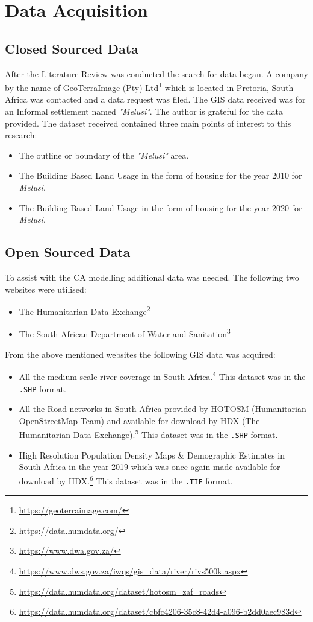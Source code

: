 \section{Data Acquisition}
\subsection{Closed Sourced Data}
After the Literature Review was conducted the search for data began. A company by the name of GeoTerraImage (Pty) Ltd\footnote{\url{https://geoterraimage.com/}} which is located in Pretoria, South Africa was contacted and a data request was filed. The GIS data received was for an Informal settlement named \textit{"Melusi"}. The author is grateful for the data provided. The dataset received contained three main points of interest to this research:
\begin{itemize}
\item The outline or boundary of the \textit{"Melusi"} area.
\item The Building Based Land Usage in the form of housing for the year 2010 for \textit{Melusi}.
\item The Building Based Land Usage in the form of housing for the year 2020 for \textit{Melusi}.
\end{itemize}
\subsection{Open Sourced Data}
\label{sec:open}
To assist with the CA modelling additional data was needed. The following two websites  were utilised:
\begin{itemize}
\item The Humanitarian Data Exchange\footnote{\url{https://data.humdata.org/}}
\item The South African Department of Water and Sanitation\footnote{\url{https://www.dwa.gov.za/}}
\end{itemize}
From the above mentioned websites the following GIS data was acquired:
\begin{itemize}
\item All the medium-scale river coverage in South Africa.\footnote{\url{https://www.dws.gov.za/iwqs/gis_data/river/rivs500k.aspx}} This dataset was in the \texttt{.SHP} format.
\item All the Road networks in South Africa provided by HOTOSM (Humanitarian OpenStreetMap Team) and available for download by HDX (The Humanitarian Data Exchange).\footnote{\url{https://data.humdata.org/dataset/hotosm_zaf_roads}} This dataset was in the \texttt{.SHP} format.
\item High Resolution Population Density Maps \& Demographic Estimates in South Africa in the year 2019 which was once again made available for download by HDX.\footnote{\url{https://data.humdata.org/dataset/cbfc4206-35c8-42d4-a096-b2dd0aec983d}} This dataset was in the \texttt{.TIF} format.
\end{itemize}
